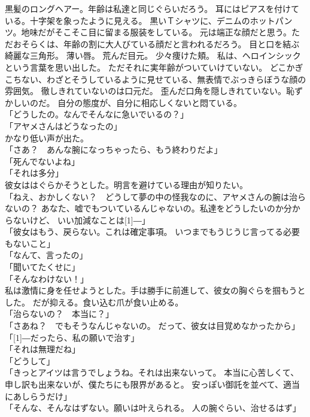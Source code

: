 \documentclass[../IHMain]{subfiles}
\begin{document}
黒髪のロングヘアー。年齢は私達と同じぐらいだろう。
耳にはピアスを付けている。十字架を象ったように見える。
黒いＴシャツに、デニムのホットパンツ。地味だがそこそこ目に留まる服装をしている。
元は端正な顔だと思う。ただおそらくは、年齢の割に大人びている顔だと言われるだろう。
目と口を結ぶ綺麗な三角形。
薄い唇。
荒んだ目元。
少々痩けた頬。
私は、ヘロインシックという言葉を思い出した。
ただそれに実年齢がついていけていない。
どこかぎこちない、わざとそうしているように見せている、無表情でぶっきらぼうな顔の雰囲気。
徹しきれていないのは口元だ。
歪んだ口角を隠しきれていない。恥ずかしいのだ。
自分の態度が、自分に相応しくないと悶ている。\\
「どうしたの。なんでそんなに急いでいるの？」\\
「アヤメさんはどうなったの」\\
かなり低い声が出た。\\
「さあ？　あんな腕になっちゃったら、もう終わりだよ」\\
「死んでないよね」\\
「それは多分」\\
彼女ははぐらかそうとした。明言を避けている理由が知りたい。\\
「ねえ、おかしくない？　どうして夢の中の怪我なのに、アヤメさんの腕は治らないの？
あなた、嘘でもついているんじゃないの。私達をどうしたいのか分からないけど、
いい加減なことは\scalebox{3}[1]{―}」\\
「彼女はもう、戻らない。これは確定事項。
いつまでもうじうじ言ってる必要もないこと」\\
「なんて、言ったの」\\
「聞いてたくせに」\\
「そんなわけない！」\\
私は激情に身を任せようとした。手は勝手に前進して、彼女の胸ぐらを掴もうとした。
だが抑える。食い込む爪が食い止める。\\
「治らないの？　本当に？」\\
「さあね？　でもそうなんじゃないの。
だって、彼女は目覚めなかったから」\\
「\scalebox{3}[1]{―}だったら、私の願いで治す」\\
「それは無理だね」\\
「どうして」\\
「きっとアイツは言うでしょうね。それは出来ないって。
本当に心苦しくて、申し訳も出来ないが、僕たちにも限界があると。
安っぽい御託を並べて、適当にあしらうだけ」\\
「そんな、そんなはずない。願いは叶えられる。
人の腕ぐらい、治せるはず」\\
\end{document}
